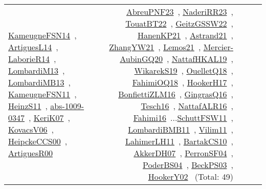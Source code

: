 {\begin{longtable}{p{3cm}r>{\raggedright\arraybackslash}p{6cm}>{\raggedright\arraybackslash}p{6cm}>{\raggedright\arraybackslash}p{8cm}}
\href{../works/KameugneFSN14.pdf}{KameugneFSN14}~\cite{KameugneFSN14}, \href{../works/ArtiguesL14.pdf}{ArtiguesL14}~\cite{ArtiguesL14}, \href{../works/LaborieR14.pdf}{LaborieR14}~\cite{LaborieR14}, \href{../works/LombardiM13.pdf}{LombardiM13}~\cite{LombardiM13}, \href{../works/LombardiMB13.pdf}{LombardiMB13}~\cite{LombardiMB13}, \href{../works/KameugneFSN11.pdf}{KameugneFSN11}~\cite{KameugneFSN11}, \href{../works/HeinzS11.pdf}{HeinzS11}~\cite{HeinzS11}, \href{../works/abs-1009-0347.pdf}{abs-1009-0347}~\cite{abs-1009-0347}, \href{../works/KeriK07.pdf}{KeriK07}~\cite{KeriK07}, \href{../works/KovacsV06.pdf}{KovacsV06}~\cite{KovacsV06}, \href{../works/HeipckeCCS00.pdf}{HeipckeCCS00}~\cite{HeipckeCCS00}, \href{../works/ArtiguesR00.pdf}{ArtiguesR00}~\cite{ArtiguesR00} & \href{../works/AbreuPNF23.pdf}{AbreuPNF23}~\cite{AbreuPNF23}, \href{../works/NaderiRR23.pdf}{NaderiRR23}~\cite{NaderiRR23}, \href{../works/TouatBT22.pdf}{TouatBT22}~\cite{TouatBT22}, \href{../works/GeitzGSSW22.pdf}{GeitzGSSW22}~\cite{GeitzGSSW22}, \href{../works/HanenKP21.pdf}{HanenKP21}~\cite{HanenKP21}, \href{../works/Astrand21.pdf}{Astrand21}~\cite{Astrand21}, \href{../works/ZhangYW21.pdf}{ZhangYW21}~\cite{ZhangYW21}, \href{../works/Lemos21.pdf}{Lemos21}~\cite{Lemos21}, \href{../works/Mercier-AubinGQ20.pdf}{Mercier-AubinGQ20}~\cite{Mercier-AubinGQ20}, \href{../works/NattafHKAL19.pdf}{NattafHKAL19}~\cite{NattafHKAL19}, \href{../works/WikarekS19.pdf}{WikarekS19}~\cite{WikarekS19}, \href{../works/OuelletQ18.pdf}{OuelletQ18}~\cite{OuelletQ18}, \href{../works/FahimiOQ18.pdf}{FahimiOQ18}~\cite{FahimiOQ18}, \href{../works/HookerH17.pdf}{HookerH17}~\cite{HookerH17}, \href{../works/BonfiettiZLM16.pdf}{BonfiettiZLM16}~\cite{BonfiettiZLM16}, \href{../works/GingrasQ16.pdf}{GingrasQ16}~\cite{GingrasQ16}, \href{../works/Tesch16.pdf}{Tesch16}~\cite{Tesch16}, \href{../works/NattafALR16.pdf}{NattafALR16}~\cite{NattafALR16}, \href{../works/Fahimi16.pdf}{Fahimi16}~\cite{Fahimi16}...\href{../works/SchuttFSW11.pdf}{SchuttFSW11}~\cite{SchuttFSW11}, \href{../works/LombardiBMB11.pdf}{LombardiBMB11}~\cite{LombardiBMB11}, \href{../works/Vilim11.pdf}{Vilim11}~\cite{Vilim11}, \href{../works/LahimerLH11.pdf}{LahimerLH11}~\cite{LahimerLH11}, \href{../works/BartakCS10.pdf}{BartakCS10}~\cite{BartakCS10}, \href{../works/AkkerDH07.pdf}{AkkerDH07}~\cite{AkkerDH07}, \href{../works/PerronSF04.pdf}{PerronSF04}~\cite{PerronSF04}, \href{../works/PoderBS04.pdf}{PoderBS04}~\cite{PoderBS04}, \href{../works/BeckPS03.pdf}{BeckPS03}~\cite{BeckPS03}, \href{../works/HookerY02.pdf}{HookerY02}~\cite{HookerY02} (Total: 49)\\

\end{longtable}}
